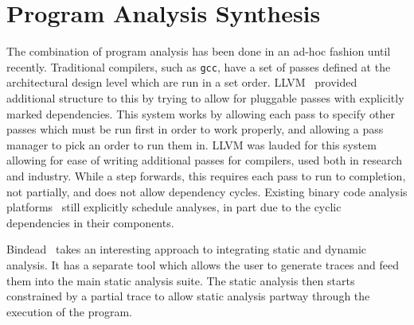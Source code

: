\section{Program Analysis Synthesis}
The combination of program analysis has been done in an ad-hoc fashion until recently.
Traditional compilers, such as \texttt{gcc}, have a set of passes defined at the architectural design level which are run in a set order.
LLVM~\cite{llvm} provided additional structure to this by trying to allow for pluggable passes with explicitly marked dependencies.
This system works by allowing each pass to specify other passes which must be run first in order to work properly, and allowing a pass manager to pick an order to run them in.
LLVM was lauded for this system allowing for ease of writing additional passes for compilers, used both in research and industry.
While a step forwards, this requires each pass to run to completion, not partially, and does not allow dependency cycles.
Existing binary code analysis platforms~\cite{jakstab,bap,codesurfer,bitblaze,boomerang,bindead,ida} still explicitly schedule analyses, in part due to the cyclic dependencies in their components.

Bindead~\cite{bindead} takes an interesting approach to integrating static and dynamic analysis.
It has a separate tool which allows the user to generate traces and feed them into the main static analysis suite.
The static analysis then starts constrained by a partial trace to allow static analysis partway through the execution of the program.
